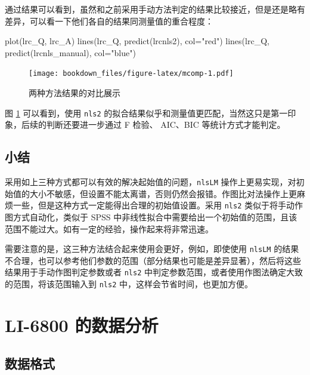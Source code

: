 \documentclass[
]{krantz}
\makeatletter
\newenvironment{Shaded}{\begin{snugshade}}{\end{snugshade}}
\newcommand{\AttributeTok}[1]{\textcolor[rgb]{0.77,0.63,0.00}{#1}}
\newcommand{\FunctionTok}[1]{\textcolor[rgb]{0.00,0.00,0.00}{#1}}
\newcommand{\NormalTok}[1]{#1}
\newcommand{\StringTok}[1]{\textcolor[rgb]{0.31,0.60,0.02}{#1}}
\newenvironment{kframe}{%
\medskip{}
\setlength{\fboxsep}{.8em}
 \def\at@end@of@kframe{}%
 \ifinner\ifhmode%
  \def\at@end@of@kframe{\end{minipage}}%
  \begin{minipage}{\columnwidth}%
 \fi\fi%
 \def\FrameCommand##1{\hskip\@totalleftmargin \hskip-\fboxsep
 \colorbox{shadecolor}{##1}\hskip-\fboxsep
     \hskip-\linewidth \hskip-\@totalleftmargin \hskip\columnwidth}%
 \MakeFramed {\advance\hsize-\width
   \@totalleftmargin\z@ \linewidth\hsize
   \@setminipage}}%
 {\par\unskip\endMakeFramed%
 \at@end@of@kframe}
\renewenvironment{Shaded}{\begin{kframe}}{\end{kframe}}
\makeatother
\begin{document}
通过结果可以看到，虽然和之前采用手动方法判定的结果比较接近，但是还是略有差异，可以看一下他们各自的结果同测量值的重合程度：

\begin{Shaded}
\begin{Highlighting}[]
\FunctionTok{plot}\NormalTok{(lrc\_Q, lrc\_A)}
\FunctionTok{lines}\NormalTok{(lrc\_Q,  }\FunctionTok{predict}\NormalTok{(lrcnls2), }\AttributeTok{col=}\StringTok{"red"}\NormalTok{)}
\FunctionTok{lines}\NormalTok{(lrc\_Q,  }\FunctionTok{predict}\NormalTok{(lrcnls\_manual), }\AttributeTok{col=}\StringTok{"blue"}\NormalTok{)}
\end{Highlighting}
\end{Shaded}

\begin{figure}
\centering
\texttt{[image: bookdown\_files/figure-latex/mcomp-1.pdf]}
\caption{\label{fig:mcomp}两种方法结果的对比展示}
\end{figure}

图 \ref{fig:mcomp} 可以看到，使用 \texttt{nls2} 的拟合结果似乎和测量值更匹配，当然这只是第一印象，后续的判断还要进一步通过 F 检验、 AIC、BIC 等统计方式才能判定。

\hypertarget{sum_start}{%
\section{小结}\label{sum_start}}

采用如上三种方式都可以有效的解决起始值的问题，\texttt{nlsLM} 操作上更易实现，对初始值的大小不敏感，但设置不能太离谱，否则仍然会报错。作图比对法操作上更麻烦一些，但是这种方式一定能得出合理的初始值设置。采用 \texttt{nls2} 类似于将手动作图方式自动化，类似于 SPSS 中非线性拟合中需要给出一个初始值的范围，且该范围不能过大。如有一定的经验，操作起来将非常迅速。

需要注意的是，这三种方法结合起来使用会更好，例如，即使使用 \texttt{nlsLM} 的结果不合理，也可以参考他们参数的范围（部分结果也可能是差异显著），然后将这些结果用于手动作图判定参数或者 \texttt{nls2} 中判定参数范围，或者使用作图法确定大致的范围，将该范围输入到 \texttt{nls2} 中，这样会节省时间，也更加方便。

\cleardoublepage

\hypertarget{anay_6800}{%
\chapter{LI-6800 的数据分析}\label{anay_6800}}

\hypertarget{data6800}{%
\section{数据格式}\label{data6800}}
\end{document}
